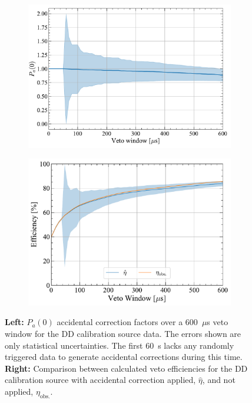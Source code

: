 \begin{figure}[!ht]
    \centering
    \begin{subfigure}[b]{0.49\textwidth}
        \centering
        \includegraphics[width=\textwidth]{figures/VetoEfficiency/SR3DDdirect_Corrections_100k.pdf}
        \caption{}
        \label{fig:VetoEff/DDAccCorrectionParameters}
    \end{subfigure}
    \hfill
    \begin{subfigure}[b]{0.49\textwidth}
        \centering
        \includegraphics[width=\textwidth]{figures/VetoEfficiency/DDAccidentalCheck.pdf}
        \caption{}
        \label{fig:VetoEff/DDAccCorrectionImpact_P0}
    \end{subfigure}
    \caption[$P_a(0)$ accidental correction factors over a 600~\textmu s for DD calibration sources alongside the veto efficiency with the corrections applied.]{\textbf{Left:} $P_a(0)$ accidental correction factors over a 600~$\mu$s veto window for the DD calibration source data. The errors shown are only statistical uncertainties. The first 60~\textmu s lacks any randomly triggered data to generate accidental corrections during this time. \textbf{Right:} Comparison between calculated veto efficiencies for the DD calibration source with accidental correction applied, $\hat{\eta}$, and not applied, $\eta_\text{obs.}$.}
    \label{fig:VetoEff/DDAccidentalPlots}
\end{figure}

